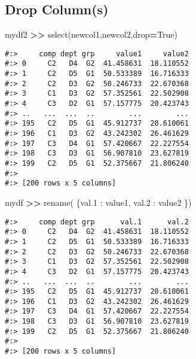 \documentclass[
]{book}
\newenvironment{Shaded}{\begin{snugshade}}{\end{snugshade}}
\newcommand{\NormalTok}[1]{#1}
\newcommand{\OperatorTok}[1]{\textcolor[rgb]{0.43,0.43,0.43}{\textbf{#1}}}
\newcommand{\StringTok}[1]{\textcolor[rgb]{0.5,0.5,0.5}{#1}}
\newcommand{\VariableTok}[1]{\textcolor[rgb]{0,0,0}{#1}}
\begin{document}
\hypertarget{drop-columns}{%
\subsection{Drop Column(s)}\label{drop-columns}}

\begin{Shaded}
\begin{Highlighting}[]
\NormalTok{mydf2 }\OperatorTok{\textgreater{}\textgreater{}}\NormalTok{ select(}\StringTok{\textquotesingle{}newcol1\textquotesingle{}}\NormalTok{,}\StringTok{\textquotesingle{}newcol2\textquotesingle{}}\NormalTok{,drop}\OperatorTok{=}\VariableTok{True}\NormalTok{)}
\end{Highlighting}
\end{Shaded}

\begin{verbatim}
#:>     comp dept grp     value1     value2
#:> 0     C2   D4  G2  41.458631  18.110552
#:> 1     C2   D5  G1  50.533389  16.716333
#:> 2     C2   D3  G2  50.246733  22.670368
#:> 3     C1   D3  G2  57.352561  22.502908
#:> 4     C3   D2  G1  57.157775  20.423743
#:> ..   ...  ...  ..        ...        ...
#:> 195   C2   D5  G1  45.912737  20.610061
#:> 196   C1   D3  G2  43.242302  26.461629
#:> 197   C3   D4  G1  57.420667  22.227554
#:> 198   C3   D3  G1  56.907810  23.627819
#:> 199   C2   D5  G1  52.375667  21.806240
#:> 
#:> [200 rows x 5 columns]
\end{verbatim}

\begin{Shaded}
\begin{Highlighting}[]
\NormalTok{mydf }\OperatorTok{\textgreater{}\textgreater{}}\NormalTok{ rename( \{}\StringTok{\textquotesingle{}val.1\textquotesingle{}}\NormalTok{ : }\StringTok{\textquotesingle{}value1\textquotesingle{}}\NormalTok{,}
                 \StringTok{\textquotesingle{}val.2\textquotesingle{}}\NormalTok{ : }\StringTok{\textquotesingle{}value2\textquotesingle{}}\NormalTok{ \})}
\end{Highlighting}
\end{Shaded}

\begin{verbatim}
#:>     comp dept grp      val.1      val.2
#:> 0     C2   D4  G2  41.458631  18.110552
#:> 1     C2   D5  G1  50.533389  16.716333
#:> 2     C2   D3  G2  50.246733  22.670368
#:> 3     C1   D3  G2  57.352561  22.502908
#:> 4     C3   D2  G1  57.157775  20.423743
#:> ..   ...  ...  ..        ...        ...
#:> 195   C2   D5  G1  45.912737  20.610061
#:> 196   C1   D3  G2  43.242302  26.461629
#:> 197   C3   D4  G1  57.420667  22.227554
#:> 198   C3   D3  G1  56.907810  23.627819
#:> 199   C2   D5  G1  52.375667  21.806240
#:> 
#:> [200 rows x 5 columns]
\end{verbatim}
\end{document}
